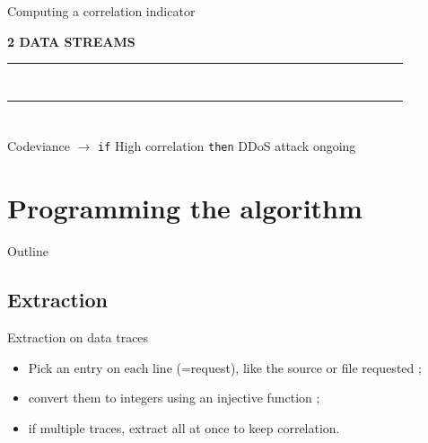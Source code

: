 \documentclass[mathserif]{beamer}
\begin{document}
	\begin{frame}{Computing a correlation indicator}
	
	\begin{center}
		\textbf{2 DATA STREAMS}
	\end{center}
	
	\begin{center}\begin{tabular}{|c|c|c|c|c|c|c|c|c|c|c|c|c|c|c|c|c|c|c|c|}
	\hline
	~ & ~ & \cellcolor{purple}~ & ~ & \cellcolor{purple}~ & ~ & ~ & \cellcolor{purple}~ & ~ & ~ & \cellcolor{purple}~ & ~ & ~ & ~ & ~ & ~ & ~ &\cellcolor{purple}~ & ~ & ~ \\
	\hline
	\end{tabular}\end{center}
	
	\begin{center}\begin{tabular}{|c|c|c|c|c|c|c|c|c|c|c|c|c|c|c|c|c|c|c|c|}
	\hline
	\cellcolor{purple}~ & ~ & ~ & ~ & \cellcolor{purple}~ & ~ & \cellcolor{purple}~ & ~ & ~ & ~ & \cellcolor{purple}~ & ~ & ~ & ~ & \cellcolor{purple}~ & ~ & ~ & ~ & \cellcolor{purple}~ & ~ \\
	\hline
	\end{tabular}\end{center}
	
	\begin{alertblock}{Codeviance $\longrightarrow$ \texttt{if} High correlation \texttt{then} DDoS attack ongoing}
	\end{alertblock}
	
	
	\end{frame}
	

\section{Programming the algorithm}

	\begin{frame}{Outline}
		\tableofcontents[currentsection]
	\end{frame}

	\subsection{Extraction}
	
	\begin{frame}{Extraction on data traces}
		\begin{block}{}
			\begin{itemize}
				\item Pick an entry on each line (=request), like the source or file requested ;
				\item convert them to integers using an injective function ;
				\item if multiple traces, extract all at once to keep correlation.
			\end{itemize}
		\end{block}
	\end{frame}
	
\end{document}
